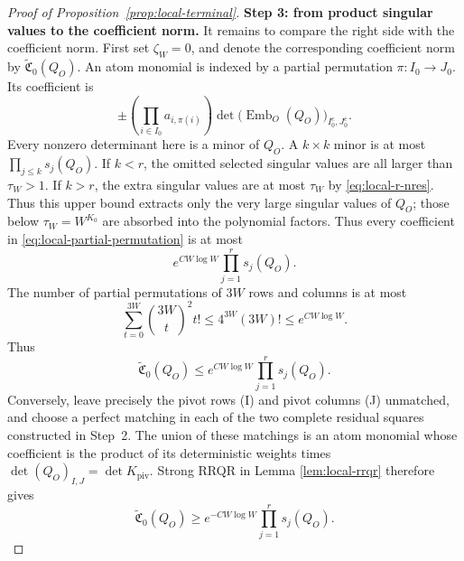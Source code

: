 \documentclass[10pt,a4paper]{amsart}
\begin{document}
\begin{proof}[Proof of Proposition~\ref{prop:local-terminal}]
\textbf{Step 3: from product singular values to the coefficient norm.}
It remains to compare the right side with the coefficient norm.  First
set \(\zeta_W=0\), and denote the corresponding coefficient norm by
\(\widetilde{\mathfrak C}_0(Q_O)\).  An atom monomial is indexed by a
partial permutation \(\pi:I_0\to J_0\).  Its coefficient is
\begin{equation}
 \pm\left(\prod_{i\in I_0}a_{i,\pi(i)}\right)
 \det\bigl(\operatorname{Emb}_O(Q_O)\bigr)_{I_0^c,J_0^c}.
 \label{eq:local-partial-permutation}
\end{equation}
Every nonzero determinant here is a minor of \(Q_O\).  A
\(k\times k\) minor is at most \(\prod_{j\leq k}s_j(Q_O)\).
If \(k<r\), the omitted selected singular values are all larger than
\(\tau_W>1\).  If \(k>r\), the extra singular values are at most
\(\tau_W\) by \eqref{eq:local-r-nres}.  Thus this upper bound extracts only
the very large singular values of $Q_O$; those below
$\tau_W=W^{K_0}$ are absorbed into the polynomial factors.
Thus every coefficient in \eqref{eq:local-partial-permutation} is at
most
\[
 e^{CW\log W}\prod_{j=1}^r s_j(Q_O).
\]
The number of partial permutations of \(3W\) rows and columns is at most
\begin{equation}
 \sum_{t=0}^{3W}\binom{3W}{t}^2t!
 \leq 4^{3W}(3W)!
 \leq e^{CW\log W}.
 \label{eq:local-partial-permutation-count}
\end{equation}
Thus
\begin{equation}
 \widetilde{\mathfrak C}_0(Q_O)
 \leq e^{CW\log W}\prod_{j=1}^r s_j(Q_O).
 \label{eq:local-coeff-upper-zero}
\end{equation}
Conversely, leave precisely the pivot rows (I) and pivot columns (J)
unmatched, and choose a perfect matching in each of the two complete
residual squares constructed in Step~2.  The union of these matchings is
an atom monomial whose coefficient is the product of its deterministic
weights times
\(\det(Q_O)_{I,J}=\det K_{\mathrm{piv}}\).
Strong RRQR in Lemma \ref{lem:local-rrqr} therefore gives
\begin{equation}
 \widetilde{\mathfrak C}_0(Q_O)
 \geq e^{-CW\log W}\prod_{j=1}^r s_j(Q_O).
 \label{eq:local-coeff-lower-zero}
\end{equation}


\end{proof}
\end{document}

